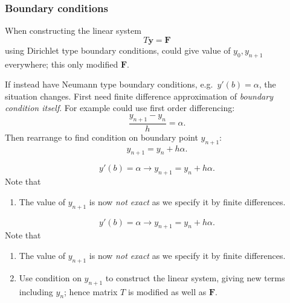 \documentclass{beamer}
\newcommand{\by}{{\boldsymbol{y}}}
\newcommand{\bfm}[1]{{\boldsymbol{#1}}}
\begin{document}
\begin{frame}
  \frametitle{Boundary conditions}

  When constructing the linear system
  \begin{equation*}
    T \by = \bfm{F}
  \end{equation*}
  using Dirichlet type boundary conditions, could give value of $y_0,
  y_{n+1}$ everywhere; this only modified $\bfm{F}$.

  \vspace{1ex}

  \begin{overlayarea}{\textwidth}{0.6\textheight}
    {
      If instead have Neumann type boundary conditions, e.g.\
      $y'(b) = \alpha$, the situation changes.
    }
    \only<3-5|handout:1>
    {
      First need finite difference approximation of
      \emph{boundary condition itself}.
    }
    \only<4-5|handout:1>
    {
      For example could use first order differencing:
      \begin{equation*}
        \frac{y_{n+1} - y_n}{h} = \alpha.
      \end{equation*}
    }
    \only<5|handout:1>
    {
      Then rearrange to find condition on boundary point $y_{n+1}$:
      \begin{equation*}
        y_{n+1} = y_n + h \alpha.
      \end{equation*}
    }
    \only<6|handout:0>
    {
      \begin{equation*}
        y'(b) = \alpha \rightarrow y_{n+1} = y_n + h \alpha.
      \end{equation*}
      \vspace{1ex}
      Note that
      \begin{enumerate}
      \item The value of $y_{n+1}$ is now \emph{not exact} as we
        specify it by finite differences.
      \end{enumerate}
    }
    {
      \begin{equation*}
        y'(b) = \alpha \rightarrow y_{n+1} = y_n + h \alpha.
      \end{equation*}
      \vspace{1ex}
      Note that
      \begin{enumerate}
      \item The value of $y_{n+1}$ is now \emph{not exact} as we
        specify it by finite differences.
      \item Use condition on $y_{n+1}$ to construct the linear system,
        giving new terms including $y_n$; hence matrix $T$ is modified
        as well as $\bfm{F}$.
      \end{enumerate}
    }
  \end{overlayarea}
\end{frame}
\end{document}
